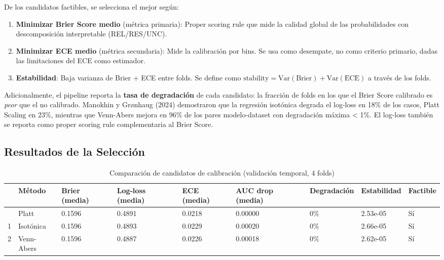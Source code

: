 \documentclass[
  spanish,
  11pt,
  letterpaper,
]{scrbook}
\providecommand{\tightlist}{%
  \setlength{\itemsep}{0pt}\setlength{\parskip}{0pt}}
\theoremstyle{plain}
\theoremstyle{remark}
\begin{document}
De los candidatos factibles, se selecciona el mejor según:

\begin{enumerate}
\def\labelenumi{\arabic{enumi}.}
\setcounter{enumi}{1}
\tightlist
\item
  \textbf{Minimizar Brier Score medio} (métrica primaria): Proper
  scoring rule que mide la calidad global de las probabilidades con
  descomposición interpretable (REL/RES/UNC).
\item
  \textbf{Minimizar ECE medio} (métrica secundaria): Mide la calibración
  por bins. Se usa como desempate, no como criterio primario, dadas las
  limitaciones del ECE como estimador.
\item
  \textbf{Estabilidad}: Baja varianza de Brier + ECE entre folds. Se
  define como
  \(\text{stability} = \text{Var}(\text{Brier}) + \text{Var}(\text{ECE})\)
  a través de los folds.
\end{enumerate}

Adicionalmente, el pipeline reporta la \textbf{tasa de degradación} de
cada candidato: la fracción de folds en los que el Brier Score calibrado
es \emph{peor} que el no calibrado. Manokhin y Grønhaug (2024)
demostraron que la regresión isotónica degrada el log-loss en 18\% de
los casos, Platt Scaling en 23\%, mientras que Venn-Abers mejora en 96\%
de los pares modelo-dataset con degradación máxima \textless{} 1\%. El
log-loss también se reporta como proper scoring rule complementaria al
Brier Score.

\subsection{Resultados de la
Selección}\label{resultados-de-la-selecciuxf3n}

{

\begin{longtable}[]{@{}lllllllll@{}}

\caption{\label{tbl-calibration-candidates}Comparación de candidatos de
calibración (validación temporal, 4 folds)}

\tabularnewline

\toprule\noalign{}
& Método & Brier (media) & Log-loss (media) & ECE (media) & AUC drop
(media) & Degradación & Estabilidad & Factible \\
\midrule\noalign{}
\endhead
\bottomrule\noalign{}
\endlastfoot
0 & Platt & 0.1596 & 0.4891 & 0.0218 & 0.00000 & 0\% & 2.53e-05 & Sí \\
1 & Isotónica & 0.1596 & 0.4893 & 0.0229 & 0.00020 & 0\% & 2.66e-05 &
Sí \\
2 & Venn-Abers & 0.1596 & 0.4887 & 0.0226 & 0.00018 & 0\% & 2.62e-05 &
Sí \\

\end{longtable}

}
\end{document}
